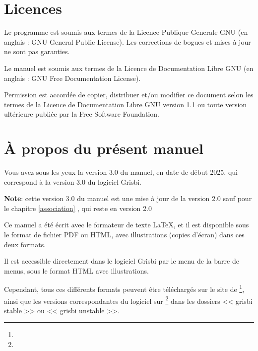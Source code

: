 \section{Licences\label{introduction-licenses}}


Le programme est soumis aux termes de la \gls{Licence Publique Generale GNU}
(en anglais : \gls{GNU General Public License}). Les corrections de bogues et mises à jour ne sont pas garanties.

Le manuel est soumis aux termes de la \gls{Licence de Documentation Libre GNU} (en anglais : \gls{GNU Free Documentation License}).

Permission est accordée de copier, distribuer et/ou modifier ce document
selon les termes de la Licence de Documentation Libre GNU version 1.1 ou toute version ultérieure publiée par la \gls{Free Software Foundation}.


\section{À propos du présent manuel\label{introduction-manual}}


Vous avez sous les yeux la version \actuality{}3.0 du manuel, en date de \actuality{}début 2025, qui correspond à la version 3.0 du logiciel Grisbi.


\textbf{Note}: cette version 3.0 du manuel est une mise à jour de la version 2.0 sauf pour le chapitre \vref{association} , qui reste en version 2.0 %


Ce manuel a été écrit avec le \gls{formateur de texte} \gls{LaTeX}, et il est disponible sous le \gls{format de fichier} \gls{PDF} ou \gls{HTML}, avec illustrations (copies d'écran) dans ces deux formats. 

Il est accessible directement dans le logiciel Grisbi par le menu  de la barre de menus, sous le format \gls{HTML} avec illustrations.

Cependant, tous ces différents formats peuvent être téléchargés sur le site de \footnote{\urlSourceForgeDocumentation{}}, ainsi que les versions correspondantes du logiciel sur \footnote{\urlSourceForge{}} dans les dossiers << \textsf{grisbi stable} >> ou << \textsf{grisbi unstable} >>.

